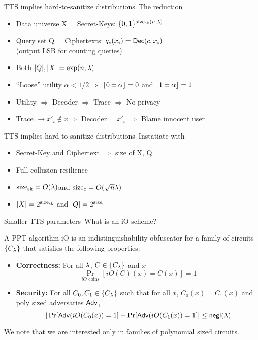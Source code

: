 \begin{frame}{TTS implies hard-to-sanitize
    distributions~\cite{conf/stoc/DworkNRRV09}}{The reduction}
  \begin{itemize}
  \item Data universe X = Secret-Keys: $\{0,1\}^{\mathrm{size_{sk}}(n,\lambda)}$
  \item Query set     Q = Ciphertexts: $q_c(x_i) = \mathsf{Dec}(c,x_i)$
        \\(output LSB for counting queries)
  \item Both     $|Q|, |X| =  \exp(n, \lambda)$
  \item ``Loose'' utility $\alpha < 1/2 \Rightarrow$ $\left\lceil{0 \pm \alpha}\right\rfloor =0$
    and $\left\lceil{1 \pm \alpha}\right\rfloor =1$
  \end{itemize}

  \begin{itemize}
  \item Utility $\Rightarrow$ Decoder $\Rightarrow$ Trace $\Rightarrow$ No-privacy
  \item Trace $\rightarrow x'_i \not\in x \Rightarrow$ Decoder = $x'_i$ $\Rightarrow$ Blame
    innocent user
  \end{itemize}
\end{frame}

\begin{frame}{TTS implies hard-to-sanitize
    distributions~\cite{conf/stoc/DworkNRRV09}}{Instatiate with~\cite{conf/eurocrypt/BonehSW06}}
  \begin{itemize}
  \item Secret-Key and Ciphertext $\Rightarrow$ size of X, Q
  \item Full collusion resilience~\cite{conf/eurocrypt/BonehSW06} 
  \item $\mathrm{size_{sk}}=O(\lambda)$\quad and \quad $\mathrm{size_c}=O(\sqrt{n}\lambda)$
  \item $|X| = 2^{\mathrm{size_{sk}}}$ \quad and \quad $|Q| = 2^{\mathrm{size_c}}$
  \end{itemize}
\end{frame}

\begin{frame}{Smaller TTS parameters~\cite{conf/tcc/KowalczykMUZ16}}{What is an
    iO scheme?}
\begin{definition}
A PPT algorithm iO is an indistinguishability obfuscator for a family of circuits
$\{C_{\lambda}\}$ that satisfies the following properties:
\begin{itemize}
\item \textbf{Correctness:} For all $\lambda$, $C \in \{C_{\lambda}\}$ and $x$
  \[
       \Pr_{iO\,\,\textrm{coins}}[ iO(C)(x) = C(x) ] = 1
  \]
\item \textbf{Security:} For all $C_0,C_1 \in \{C_{\lambda}\}$ such that for all
  $x$, $C_0(x) = C_1(x)$ and poly sized adversaries $\mathsf{Adv}$,
  \[
     | \Pr[ \mathsf{Adv}(iO(C_0(x)) = 1 ] - \Pr[ \mathsf{Adv}(iO(C_1(x)) = 1 ] | \leq \mathsf{negl}(\lambda)
  \]
\end{itemize}
\end{definition}
We note that we are interested only in families of polynomial sized circuits.
\end{frame}

